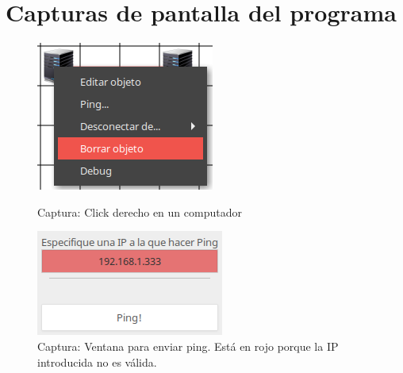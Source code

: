 \documentclass[a4paper, 11pt]{report} %
\begin{document}
\nocite{*}
%
\printbibliography[heading=bibintoc]

\appendix

\chapter{Capturas de pantalla del programa}
\noindent\begin{figure}[H]
\centering
\begin{minipage}[t]{0.4\textwidth}
	\centering
	\includegraphics[scale=0.6]{Resources/Screenshots/2016-09-12-172627_1000x700_scrot.png}%
	\caption{Captura: Click derecho en un computador}
\end{minipage}
\hspace*{0.15\textwidth}
\begin{minipage}[t]{0.4\textwidth}
	\centering
	\includegraphics[width=\textwidth]{Resources/Screenshots/2016-09-12-225752_233x131_scrot.png}%
	\caption[Captura: Ventana para enviar ping.]{Captura: Ventana para enviar ping. Está en rojo porque la IP introducida no es válida.}
	\label{fig:pingwindow}
\end{minipage}


\end{figure}
\end{document}
